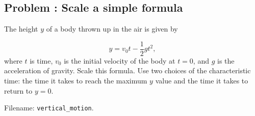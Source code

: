 \documentclass[graybox,envcountchap,sectrefs,final]{svmonodo}
\newcounter{doconce:movie:counter}
\newenvironment{doconceexercise}{}{}
\newcounter{doconceexercisecounter}
\begin{document}
\begin{doconceexercise}

\subsection*{Problem \thedoconceexercisecounter: Scale a simple formula}

\label{sec:scale:exer:ball_y}

The height $y$ of a body thrown up in the air is given by

\[ y = v_0t - \frac{1}{2}gt^2,\]
where $t$ is time, $v_0$ is the initial velocity of the body at $t=0$,
and $g$ is the acceleration of gravity. Scale this formula. Use
two choices of the characteristic time: the time it takes to reach the
maximum $y$ value and the time it takes to return to $y=0$.


\noindent Filename: \Verb!vertical_motion!.

\end{doconceexercise}
\end{document}
